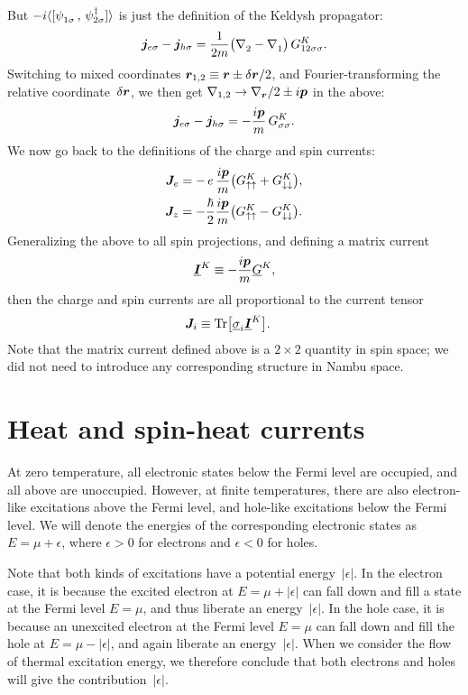 But $-i\avg{ [ \pc{\psi_{1 \sigma}}\,,\, \hc{\psi_{2 \sigma}} ] }$ is just the definition of the Keldysh propagator:
\begin{align}
  \B{j}_{e\sigma} - \B{j}_{h\sigma} =
  \frac{1}{2m} \big(\pc{\nabla_2} - \pc{\nabla_1}\big) \, G^K_{12\sigma\sigma}.
\end{align}
Switching to mixed coordinates $\bm{r}_{1,2} \equiv \bm{r} \pm \delta\bm{r}/2$, and Fourier-transforming the relative coordinate~$\delta\bm{r}$, we then get $\nabla_{1,2} \rightarrow \nabla_{\bm{r}}/2 \pm i\bm{p}$ in the above:
\begin{align}
  \bm{j}_{e\sigma} - \bm{j}_{h\sigma} =
  -\frac{i\bm{p}}{m} \, G^K_{\sigma\sigma}.
\end{align}
We now go back to the definitions of the charge and spin currents:
\begin{align}
  \bm{J}_{e} &= -\,e\, \frac{i\bm{p}}{m} \big( G^K_{\uparrow\uparrow} + G^K_{\downarrow\downarrow} \big), \\
  \bm{J}_{z} &= -\frac{\hbar}{2} \frac{i\bm{p}}{m} \big( G^K_{\uparrow\uparrow}  - G^K_{\downarrow\downarrow} \big).
\end{align}
Generalizing the above to all spin projections, and defining a matrix current
\begin{equation}
  \underline{\bm{I}}^K \equiv -\frac{i\bm{p}}{m}\underline{G}^K,
\end{equation}
then the charge and spin currents are all proportional to the current tensor
\begin{align}
  \label{eq:current-tensor-def}
  \bm{J}_{i} &\equiv \operatorname{Tr}\!\big[\underline{\sigma}_i \underline{\bm{I}}^K \big].
\end{align}
Note that the matrix current defined above is a $2\times2$ quantity in spin space; we did not need to introduce any corresponding structure in Nambu space.



\section{Heat and spin-heat currents}
At zero temperature, all electronic states below the Fermi level are occupied, and all above are unoccupied.
However, at finite temperatures, there are also electron-like excitations above the Fermi level, and hole-like excitations below the Fermi level.
We will denote the energies of the corresponding electronic states as $E = \mu + \epsilon$, where $\epsilon > 0$ for electrons and $\epsilon < 0$ for holes.

Note that both kinds of excitations have a potential energy~$|\epsilon|$.
In the electron case, it is because the excited electron at $E = \mu+|\epsilon|$ can fall down and fill a state at the Fermi level $E = \mu$, and thus liberate an energy~$|\epsilon|$.
In the hole case, it is because an unexcited electron at the Fermi level $E = \mu$ can fall down and fill the hole at $E = \mu-|\epsilon|$, and again liberate an energy~$|\epsilon|$.
When we consider the flow of thermal excitation energy, we therefore conclude that both electrons and holes will give the contribution~$|\epsilon|$.

